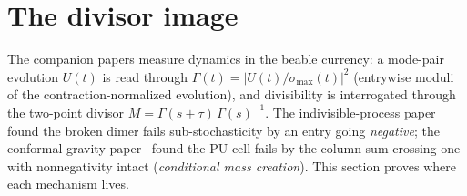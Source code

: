 ﻿\documentclass[11pt]{article}
\theoremstyle{remark}
\begin{document}
\section{The divisor image}
\label{sec:divisor}

The companion papers measure dynamics in the beable currency: a
mode-pair evolution $U(t)$ is read through
$\Gamma(t)=|U(t)/\sigma_{\max}(t)|^2$ (entrywise moduli of the
contraction-normalized evolution), and divisibility is interrogated
through the two-point divisor $M=\Gamma(s+\tau)\,\Gamma(s)^{-1}$.
The indivisible-process paper~\cite{indivisible} found the broken
dimer fails sub-stochasticity by an entry going \emph{negative}; the
conformal-gravity paper~\cite{choosing} found the PU cell fails by the
column sum crossing one with nonnegativity intact (\emph{conditional
mass creation}). This section proves
where each mechanism lives.
\end{document}
